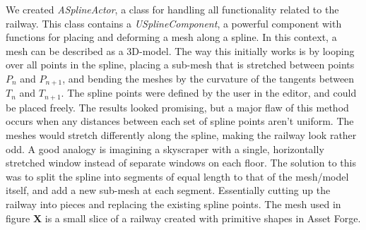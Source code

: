 We created \textit{ASplineActor}, a class for handling all functionality related to the railway. This class contains a \textit{USplineComponent}, a powerful component with functions for placing and deforming a mesh along a spline. In this context, a mesh can be described as a 3D-model. The way this initially works is by looping over all points in the spline, placing a sub-mesh that is stretched between points $P_n$ and $P_{n+1}$, and bending the meshes by the curvature of the tangents between $T_n$ and $T_{n+1}$. The spline points were defined by the user in the editor, and could be placed freely. The results looked promising, but a major flaw of this method occurs when any distances between each set of spline points aren't uniform. The meshes would stretch differently along the spline, making the railway look rather odd. A good analogy is imagining a skyscraper with a single, horizontally stretched window instead of separate windows on each floor. The solution to this was to split the spline into segments of equal length to that of the mesh/model itself, and add a new sub-mesh at each segment. Essentially cutting up the railway into pieces and replacing the existing spline points. The mesh used in figure \textbf{X} is a small slice of a railway created with primitive shapes in Asset Forge. \\



